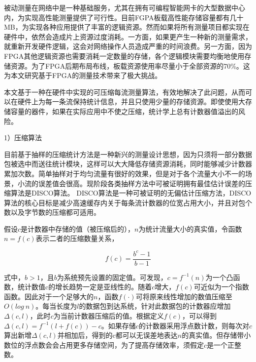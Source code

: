 
被动测量在网络中是一种基础服务，尤其在拥有可编程智能网卡的大型数据中心内，为实现高性能测量提供了可行性。目前FGPA板载高性能存储容量都有几十MB，为实现各种应用提供了丰富的逻辑资源。然而如果将所有测量项目都实现在硬件中，依然会造成片上资源过度消耗。一方面，如果更产生一种新的测量需求，就重新开发硬件逻辑，这会对网络操作人员造成严重的时间浪费。另一方面，因为FPGA其他逻辑资源也需要消耗一定数量的存储，各个逻辑模块需要均衡地使用存储资源。为了FPGA后期布局布线，板载资源使用率尽量小于全部资源的70\%。这为本文研究基于FPGA的测量技术带来了极大挑战。

本文基于一种在硬件中实现的可压缩每流测量算法，有效地解决了此问题，从而可以在硬件上为每一条流保持统计信息，并且只使用少量的存储资源。即使使用大存储容量的器件，如果在实际应用中不使之压缩，统计学上总有计数器值溢出的风险。


1）压缩算法

目前基于抽样的压缩统计方法是一种新兴的测量设计思想，因为只须将一部分数据包被选中而送往统计模块，这样可以大大降低存储资源消耗，同时能够减少计数器累加次数。简单抽样对于均匀流量有很好的效果，但是对于各个流量大小不一的场景，小流的误差值会很高。现阶段各类抽样方法中可被证明拥有最佳估计误差的压缩算法是DISCO算法。%
DISCO算法是一种可被证明的无偏估计压缩方法，DISCO算法的核心目标是减少高速缓存内关于每条流计数器的位宽占用大小，并且对包个数以及字节数的压缩都可适用。

假设$ c $是计数器中存储的值（被压缩后的），$ n $为统计流量大小的真实值，令函数$ n=f(c) $表示二者的压缩数量关系，

\begin{equation} \label{discofunc}
f(c)=\frac{b^c-1}{b-1}
\end{equation}

式中，$ b>1 $，且$ b $为系统预先设置的固定值。可发现，$ c=f^{-1}(n) $为一个凸函数，统计数值c的增长趋势一定是亚线性的。随着$ c $增大，$ f(c) $可近似为一个指数函数。因此对于一个足够大的$ n $，函数$ f(\cdot) $可将原来线性增加的数值压缩至$ O(log~n) $。每当长度为$ l $的数据包到达系统，针对此数据包的计数器应增加$ \Delta(c,l) $，此时$ c $为当前计数器压缩后的值。根据定义$ f(c) $，可以得到$ \Delta(c,l)=f^{-1}(l+f(c))-c $。如果存储$ c $的计数器采用浮点数计数，则每次对$ c $算出新增$ \Delta(c,l) $并相加后，得到的c都可以无误差地表达$ n $的真实值。但存储带小数位的浮点数会会占用更多存储空间，为了提高存储效率，须假定$ c $是一个正整数。



